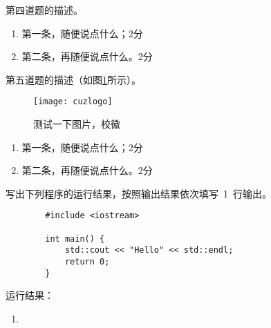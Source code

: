 \documentclass[]{cuzexam} %
\begin{document}
\begin{problem}
    第四道题的描述。
\end{problem}

\begin{solution}
    \begin{enumerate}[label=(\arabic*)]
        \item 第一条，随便说点什么；\dotfill 2分
        \item 第二条，再随便说点什么。\dotfill 2分
    \end{enumerate}
\end{solution}

\begin{studentanswer}
    \vspace{28ex}
\end{studentanswer}

\begin{problem}
    第五道题的描述（如图\ref{fig:1}所示）。
    \begin{figure}[h]
        \centering
        \texttt{[image: cuzlogo]}
        \caption[校徽]{测试一下图片，校徽}
        \label{fig:1}
    \end{figure}
\end{problem}

\begin{solution}
    \begin{enumerate}[label=(\arabic*)]
        \item 第一条，随便说点什么；\dotfill 2分
        \item 第二条，再随便说点什么。\dotfill 2分
    \end{enumerate}
\end{solution}

\begin{studentanswer}
    \vspace{28ex}
\end{studentanswer}


\begin{problem}
    写出下列程序的运行结果，按照输出结果依次填写~1~行输出。
    \begin{verbatim}
        #include <iostream>
        
        int main() {
            std::cout << "Hello" << std::endl;
            return 0;
        }
    \end{verbatim}
    运行结果：
    \begin{enumerate}[label=(\arabic*),series=cuzafter]
        \item {}
    \end{enumerate}
\end{problem}
\end{document}
